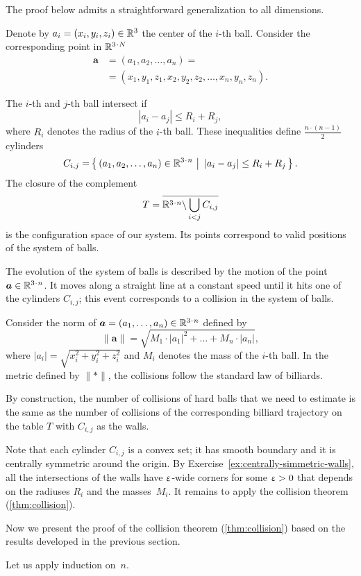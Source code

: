 The proof below admits a straightforward generalization to all dimensions.

Denote by $a_i=(x_i,y_i,z_i) \in \RR^3$ the center of the $i$-th ball.
Consider the corresponding point in $\RR^{3\cdot N}$
\begin{align*}
\bm{a}&=(a_1, a_2 , \dots , a_n ) =
\\
&=(x_1, y_1 , z_1 , x_2 , y_2 , z_2 , \dots , x_n , y_n , z_n).
\end{align*}

The $i$-th and $j$-th ball intersect if 
$$|a_i - a_j | \le R_i+R_j,$$
where $R_i$ denotes the radius of the $i$-th ball.
These inequalities define $\tfrac{n\cdot(n-1)}{2}$ cylinders 
\[C_{i,j}=\set{(a_1, a_2 , \dots , a_n )\in\RR^{3\cdot n}} {|a_i - a_j |\le R_i+R_j}.\] 
The closure of the complement
\[T=\overline{\RR^{3\cdot n}\backslash \bigcup_{i< j} C_{i,j}}\] 
is the configuration space of our system. 
Its points correspond
to valid positions of the system of balls.

The evolution of the system
of balls is described by the motion of
the point $\bm{a}\in\RR^{3\cdot n}$.
It moves along a straight line at a
constant speed until it hits one of the cylinders $C_{i,j}$; 
this event corresponds
to a collision in the system of balls.

Consider the norm of $\bm{a}=(a_1,\dots,a_n)\in \RR^{3\cdot n}$ defined by
\[\lVert \bm{a}\rVert
=
\sqrt{M_1\cdot|a_1|^2+\dots+M_n\cdot |a_n|},\]
where $|a_i|=\sqrt{x_i^2+y_i^2+z_i^2}$ 
and $M_i$ denotes the mass of the $i$-th ball.
In the metric defined by $\lVert {*}\rVert$,
the collisions follow the
standard law of billiards. 

By construction, the number of collisions of hard balls that we need to estimate 
is the same as the number of collisions of the corresponding billiard trajectory on the table $T$ with $C_{i,j}$ as the walls.

Note that each cylinder $C_{i,j}$ is a convex set;
it has smooth boundary 
and it is centrally symmetric around the origin.
By Exercise~\ref{ex:centrally-simmetric-walls}, all the intersections of the walls have $\upvarepsilon$-wide corners for some $\upvarepsilon>0$ that depends on the radiuses $R_i$ and the masses~$M_i$.
It remains to apply the collision theorem (\ref{thm:collision}).
\qeds

Now we present the proof of the collision theorem (\ref{thm:collision})
based on the results developed in the previous section.

Let us apply induction on~$n$.

